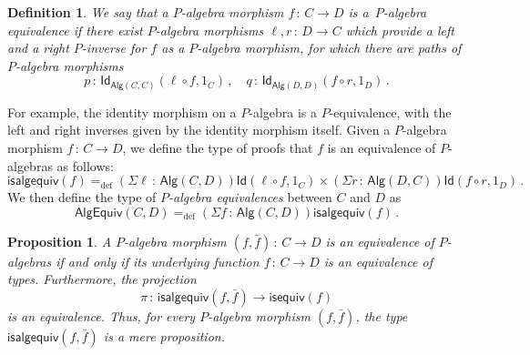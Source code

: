 \documentclass[10pt,a4paper,oneside,reqno]{amsart}
\theoremstyle{mythm}
\newtheorem{proposition}[theorem]{Proposition}
\theoremstyle{mydef}
\newtheorem{definition}[theorem]{Definition}
\theoremstyle{myrmk}
\newcommand{\ie}{\text{i.e.\ }}
\newcommand{\defeq}{=_{\mathrm{def}}}
\newcommand{\co}{\,{:}\,}
\newcommand{\Id}{\mathsf{Id}}
\newcommand{\Palg}{\mathsf{Alg}}
\newcommand{\isalgequiv}{\mathsf{isalgequiv}}
\newcommand{\AlgEquiv}{\mathsf{AlgEquiv}}
\begin{document}
\begin{definition} We say that a $P$-algebra morphism $f \co C \to D$ is 
 a~\emph{$P$-algebra equivalence}
if there exist $P$-algebra morphisms $\ell,r \co D \to C$  which provide a left and a right $P$-inverse for $f$ as a
$P$-algebra morphism, \ie for
which there are paths of $P$-algebra morphisms
\[ 
p \co \Id_{\Palg(C,C)}( \ell \circ f,  1_C) \, , \quad q \co \Id_{\Palg(D,D)}( f \circ r , 1_D) \, .
\]
\end{definition}

For example, the identity morphism on a $P$-algebra is a $P$-equivalence, with the left and right inverses given by the identity morphism itself.  Given a $P$-algebra morphism $f \co C \to D$, we define the type of proofs that $f$ is an equivalence of $P$-algebras as follows:
\[
\isalgequiv(f) \defeq  (\Sigma \ell \co  \Palg(C,D)) \Id( \ell \circ f, 1_C )  \times 
    (\Sigma r  \co \Palg(D, C)) \Id( f \circ r , 1_D ) \, .
\]
We then define the type of \emph{$P$-algebra equivalences} between $C$ and $D$ as
\[
\AlgEquiv(C, D)
\defeq   (\Sigma f \co \Palg(C,D)) \isalgequiv(f)  \, . 
\] 


\begin{proposition}\label{WAlgSpace} A $P$-algebra morphism $(f, \bar{f}) \co C \to D$ is an equivalence of
$P$-algebras if and only
if its underlying function $f \co C \to D$ is an equivalence of types. Furthermore, the projection
\[
\pi \co \isalgequiv(f, \bar{f})  \to \mathsf{isequiv}(f)  
\]
is an equivalence. Thus, for every $P$-algebra morphism $(f, \bar{f})$, the type $\isalgequiv(f, \bar{f})$ is
a mere proposition. 
\end{proposition}  
\end{document}
